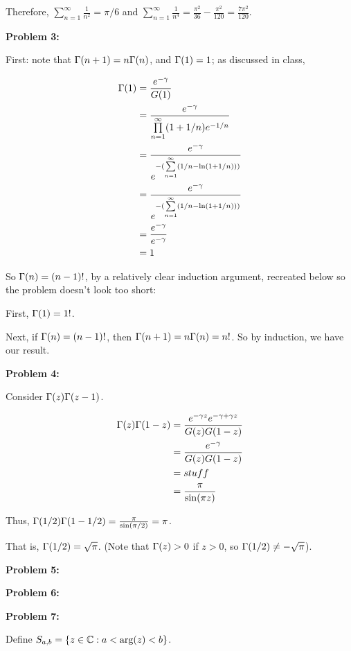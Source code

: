 \documentclass[a4paper,12pt]{article}
\begin{document}
Therefore, $\sum\limits_{n=1}^\infty \frac{1}{n^2} = \pi/6$ and $\sum\limits_{n=1}^\infty \frac{1}{n^4} = \frac{\pi^2}{36} - \frac{\pi^2}{120} = \frac{7\pi^2}{120}$.

\shunt

{\bf Problem 3:}

First: note that $\Gamma(n+1) = n\Gamma(n)$, and $\Gamma(1) = 1$; as discussed in class, 

\begin{align*}
\Gamma(1) &= \frac{e^{-\gamma}}{G(1)}\\
&= \frac{e^{-\gamma}}{\prod\limits_{n=1}^\infty (1+1/n)e^{-1/n}}\\
&= \frac{e^{-\gamma}}{e^{-(\sum\limits_{n=1}^\infty (1/n - \ln(1+1/n)))}}\\
&= \frac{e^{-\gamma}}{e^{-(\sum\limits_{n=1}^\infty (1/n - \ln(1+1/n)))}}\\
&= \frac{e^{-\gamma}}{e^{-\gamma}}\\
&= 1
\end{align*} %

So $\Gamma(n) = (n-1)!$, by a relatively clear induction argument, recreated below so the problem doesn't look too short:

First, $\Gamma(1) = 1!$.

Next, if $\Gamma(n) = (n-1)!$, then $\Gamma(n+1) = n\Gamma(n) = n!$. So by induction, we have our result.

\shunt

{\bf Problem 4:}

Consider $\Gamma(z)\Gamma(z-1)$.

\begin{align*}
\Gamma(z)\Gamma(1-z) &= \frac{e^{-\gamma z}e^{-\gamma + \gamma z}}{G(z)G(1-z)}\\
&= \frac{e^{-\gamma}}{G(z)G(1-z)}\\
&= stuff\\
&= \frac{\pi}{\sin(\pi z)}
\end{align*}

Thus, $\Gamma(1/2)\Gamma(1-1/2) = \frac{\pi}{\sin(\pi/2)} = \pi$.

That is, $\Gamma(1/2) = \sqrt{\pi}$. (Note that $\Gamma(z) > 0$ if $z >0$, so $\Gamma(1/2) \neq - \sqrt{\pi}$).

\shunt

{\bf Problem 5:}

\shunt

{\bf Problem 6:}

\shunt

{\bf Problem 7:}

Define $S_{a,b} = \{z \in \mathbb{C}: a< \text{arg}(z) < b\}$.
\end{document}
